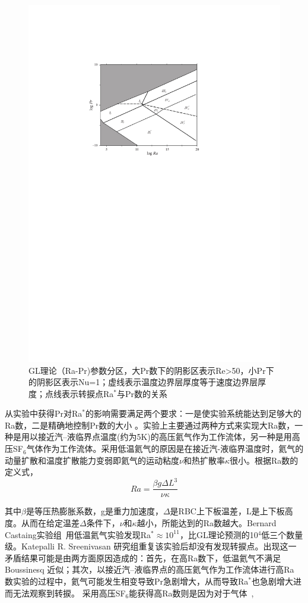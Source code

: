 \documentclass[10pt,aps]{article}
\def\be{\begin{equation}}
\def\ee{\end{equation}}
\begin{document}
{\begin{figure}[htb]
  \centering
  \includegraphics[width=0.6\linewidth]{GL_Theory.pdf}
  \caption{GL理论（Ra-Pr)参数分区，大Pr数下的阴影区表示Re>50，小Pr下的阴影区表示Nu=1；虚线表示温度边界层厚度等于速度边界层厚度；点线表示转捩点Ra$^*$与Pr数的关系~\cite{GL00}}
  \label{fig:GL_Theory}
\end{figure}
\vskip 6pt


从实验中获得Pr对Ra$^*$的影响需要满足两个要求：一是使实验系统能达到足够大的Ra数，二是精确地控制Pr数的大小 。实验上主要通过两种方式来实现大Ra数，一种是用以接近汽–液临界点温度(约为5K)的高压氦气作为工作流体，另一种是用高压SF$_6$气体作为工作流体。采用低温氦气的原因是在接近汽-液临界温度时，氦气的动量扩散和温度扩散能力变弱即氦气的运动粘度$\nu$和热扩散率$\kappa$很小。根据Ra数的定义式，
\be
 Ra=\frac{\beta g\Delta L^3  }{\nu\kappa}
\ee
\vskip 6pt

其中$\beta$是等压热膨胀系数，g是重力加速度，$\Delta $是RBC上下板温差，L是上下板高度。从而在给定温差$\Delta$条件下，$\nu$和$\kappa$越小，所能达到的Ra数越大。Bernard Castaing实验组~\cite{CCCHCC97,CCCCH01}用低温氦气实验发现Ra$^*\approx 10^{11}$，比GL理论预测的10$^4$低三个数量级。Katepalli R. Sreenivasan 研究组重复该实验后却没有发现转捩点。出现这一矛盾结果可能是由两方面原因造成的：首先，在高Ra数下，低温氦气不满足Boussinesq 近似；其次，以接近汽–液临界点的高压氦气作为工作流体进行高Ra 数实验的过程中，氦气可能发生相变导致Pr急剧增大，从而导致Ra$^*$也急剧增大进而无法观察到转捩。
\vskip 6pt
采用高压SF$_6$能获得高Ra数则是因为对于气体~\cite{AFB09},

}
\end{document}
